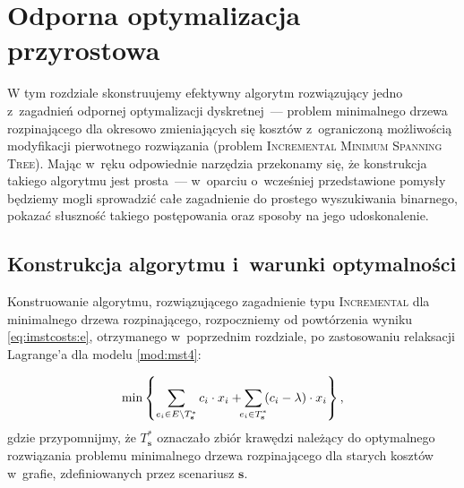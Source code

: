 \chapter{Odporna optymalizacja przyrostowa}\label{ch:binaryIncMST}
\thispagestyle{chapterBeginStyle}





W tym rozdziale skonstruujemy efektywny algorytm rozwiązujący jedno z~zagadnień odpornej optymalizacji dyskretnej~--- problem minimalnego drzewa rozpinającego dla okresowo zmieniających się kosztów z~ograniczoną możliwością modyfikacji pierwotnego rozwiązania (problem \textsc{Incremental Minimum Spanning Tree}).
Mając w~ręku odpowiednie narzędzia przekonamy się, że konstrukcja takiego algorytmu jest prosta~--- w~oparciu o~wcześniej przedstawione pomysły będziemy mogli sprowadzić całe zagadnienie do prostego wyszukiwania binarnego, pokazać słuszność takiego postępowania oraz sposoby na jego udoskonalenie.




\section{Konstrukcja algorytmu i~warunki optymalności}




Konstruowanie algorytmu, rozwiązującego zagadnienie typu \textsc{Incremental} dla minimalnego drzewa rozpinającego, rozpoczniemy od powtórzenia wyniku \ref{eq:imstcosts:e}, otrzymanego w~poprzednim rozdziale, po zastosowaniu relaksacji Lagrange'a dla modelu \ref{mod:mst4}:

\begin{eqnarray}\label{eq:imstcosts2}
	\min \left\{ \sum_{e_{i} \in E \setminus T^{\ast}_{\textbf{s}}} c_{i} \cdot x_{i} + \sum_{\mathclap{e_{i} \in T^{\ast}_{\textbf{s}}}} \left( c_{i} - \lambda \right) \cdot x_{i} \right\}\text{,}
\end{eqnarray}
gdzie przypomnijmy, że $T^{\ast}_{\textbf{s}}$ oznaczało zbiór krawędzi należący do optymalnego rozwiązania problemu minimalnego drzewa rozpinającego dla starych kosztów w~grafie, zdefiniowanych przez scenariusz $\textbf{s}$.

